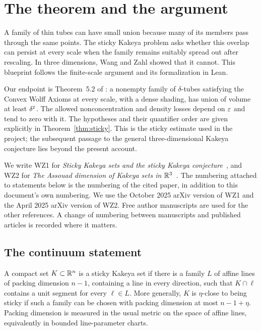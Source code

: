 \chapter{The theorem and the argument}
\label{chap:introduction}

A family of thin tubes can have small union because many of its members
pass through the same points. The sticky Kakeya problem asks whether this
overlap can persist at every scale when the family remains suitably spread
out after rescaling. In three dimensions, Wang and Zahl showed that it
cannot. This blueprint follows the finite-scale argument and its
formalization in Lean.

Our endpoint is Theorem~5.2 of \cite{WZ2}: a nonempty family of
$\delta$-tubes satisfying the Convex Wolff Axioms at every scale, with a
dense shading, has union of volume at least $\delta^\varepsilon$. The allowed
nonconcentration and density losses depend on $\varepsilon$ and tend to zero
with it. The hypotheses and their quantifier order are given explicitly
in Theorem~\ref{thm:sticky}. This is the sticky estimate used in the
project; the subsequent passage to the general three-dimensional Kakeya
conjecture lies beyond the present account.

We write WZ1 for \emph{Sticky Kakeya sets and the sticky Kakeya
conjecture}~\cite{WZ1}, and WZ2 for \emph{The Assouad dimension of Kakeya
sets in $\mathbb{R}^3$}~\cite{WZ2}. The numbering attached to statements below
is the numbering of the cited paper, in addition to this document's own
numbering. We use the October 2025 arXiv version of WZ1 and the April
2025 arXiv version of WZ2. Free author manuscripts are used for the other
references. A change of numbering between manuscripts and published
articles is recorded where it matters.

\section{The continuum statement}

\begin{definition}
\label{def:continuum-sticky}
A compact set $K\subset\mathbb{R}^n$ is a sticky Kakeya set if there is a
family $L$ of affine lines of packing dimension $n-1$, containing a
line in every direction, such that $K\cap\ell$ contains a unit
segment for every $\ell\in L$. More generally, $K$ is
$\eta$-close to being sticky if such a family can be chosen with
packing dimension at most $n-1+\eta$. Packing dimension is measured
in the usual metric on the space of affine lines, equivalently in
bounded line-parameter charts.
\end{definition}

